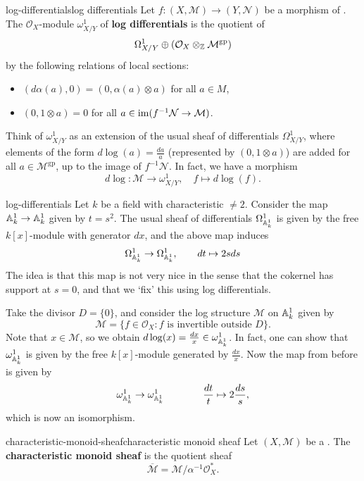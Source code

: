 \begin{topic}{log-differentials}{log differentials}
    Let $f : (X, \mathcal{M}) \to (Y, \mathcal{N})$ be a morphism of . The $\mathcal{O}_X$-module $\omega^1_{X/Y}$ of \textbf{log differentials} is the quotient of
    \[ \Omega_{X/Y}^1 \oplus (\mathcal{O}_X \otimes_\ZZ \mathcal{M}^\text{gp}) \]
    by the following relations of local sections:
    \begin{itemize}
        \item $(d \alpha(a), 0) = (0, \alpha(a) \otimes a)$ for all $a \in M$,
        \item $(0, 1 \otimes a) = 0$ for all $a \in \im(f^{-1} \mathcal{N} \to \mathcal{M})$.
    \end{itemize}
    
    Think of $\omega^1_{X/Y}$ as an extension of the usual sheaf of differentials $\Omega_{X/Y}^1$, where elements of the form $d \log(a) = \frac{da}{a}$ (represented by $(0, 1 \otimes a)$) are added for all $a \in \mathcal{M}^\text{gp}$, up to the image of $f^{-1} \mathcal{N}$. In fact, we have a morphism
    \[ d \log : \mathcal{M} \to \omega_{X/Y}^1, \quad f \mapsto d \log(f) . \]
\end{topic}

\begin{example}{log-differentials}
    Let $k$ be a field with characteristic $\ne 2$. Consider the map $\AA^1_k \to \AA^1_k$ given by $t = s^2$. The usual sheaf of differentials $\Omega^1_{\AA^1_k}$ is given by the free $k[x]$-module with generator $d x$, and the above map induces
    \[ \Omega^1_{\AA^1_k} \to \Omega^1_{\AA^1_k}, \qquad d t \mapsto 2 s d s \]
    The idea is that this map is not very nice in the sense that the cokernel has support at $s = 0$, and that we `fix' this using log differentials.
    
    Take the divisor $D = \{ 0 \}$, and consider the log structure $\mathcal{M}$ on $\AA^1_k$ given by
    \[ \mathcal{M} = \{ f \in \mathcal{O}_X : f \text{ is invertible outside } D \} . \]
    Note that $x \in \mathcal{M}$, so we obtain $d \log(x) = \frac{d x}{x} \in \omega^1_{\AA^1_k}$. In fact, one can show that $\omega^1_{\AA^1_k}$ is given by the free $k[x]$-module generated by $\frac{d x}{x}$. Now the map from before is given by
    \[ \omega^1_{\AA^1_k} \to \omega^1_{\AA^1_k} \qquad  \qquad \frac{d t}{t} \mapsto 2 \frac{d s} s , \]
    which is now an isomorphism.
\end{example}

\begin{topic}{characteristic-monoid-sheaf}{characteristic monoid sheaf}
    Let $(X, \mathcal{M})$ be a . The \textbf{characteristic monoid sheaf} is the quotient sheaf
    \[ \overline{\mathcal{M}} = \mathcal{M} / \alpha^{-1} \mathcal{O}_X^* . \]
\end{topic}

